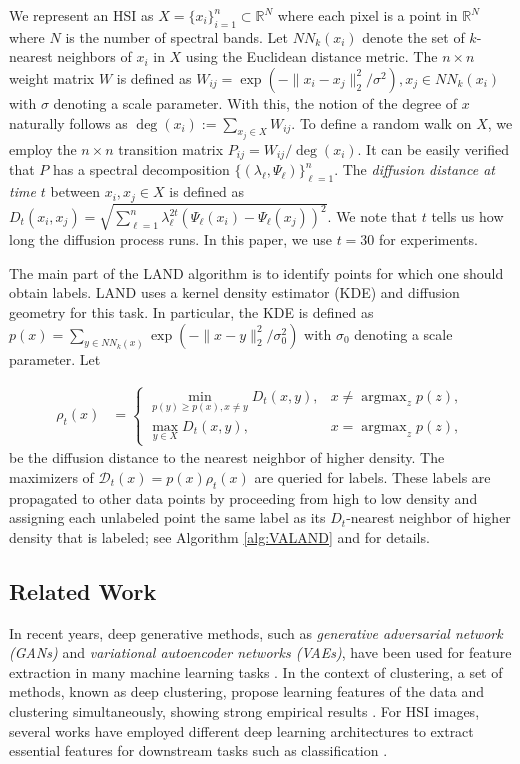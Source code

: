 \documentclass{article}
\DeclareMathOperator*{\argmax}{argmax} %
\def\R{\mathbb{R}}
\def\R{{\mathbb R}}
\newcommand{\Dt}{\mathcal{D}_{t}}
\begin{document}
We represent an HSI as $X=\{x_{i}\}_{i=1}^{n}\subset\mathbb{R}^{N}$ where each pixel is a point in $\R^{N}$ where $N$ is the number of spectral bands. Let $NN_{k}(x_{i})$ denote the set of $k$-nearest neighbors of $x_{i}$ in $X$ using the Euclidean distance metric.
The $n\times n$ weight matrix $W$ is defined as $W_{ij}=\exp(-\|x_{i}-x_{j}\|_{2}^{2}/\sigma^{2}), x_{j}\in NN_{k}(x_{i})$ with $\sigma$ denoting a scale parameter. With this, the notion of the degree of $x$ naturally follows as $\deg(x_{i}):=\sum_{x_{j}\in X}W_{ij}$. To define a random walk on $X$, we employ the $n\times n$ transition matrix $P_{ij}={W_{ij}}\big/{\deg(x_{i})}.$ It can be easily verified that $P$ has a spectral decomposition $\{(\lambda_{\ell},\Psi_{\ell})\}_{\ell=1}^{n}$. The \emph{diffusion distance at time $t$} between $x_{i},x_{j}\in X$ is defined as $D_{t}(x_{i},x_{j})=\sqrt{\sum\nolimits_{\ell=1}^{n}\lambda_{\ell}^{2t}(\Psi_{\ell}(x_{i})-\Psi_{\ell}(x_{j}))^{2}}$.  We note that $t$ tells us how long the diffusion process runs. In this paper, we use $t=30$ for experiments.

The main part of the LAND algorithm is to identify points for which one should obtain labels. LAND uses a kernel density estimator (KDE) and diffusion geometry for this task. In particular, the KDE is defined as $p(x)=\sum_{y\in NN_{k}(x)}\exp(-\|x-y\|_{2}^{2}/\sigma_{0}^{2})$ with $\sigma_0$ denoting a scale parameter.  Let 

\begin{align}\label{eqn:rho}
\rho_{t}(x) &=
\begin{cases}
\displaystyle\min_{p(y)\ge p(x), x\neq y} D_{t}(x,y), &x\neq \displaystyle\argmax_{z}p(z), \\
\displaystyle\max_{y\in X} D_{t}(x,y), & x=\displaystyle\argmax_{z}p(z),
\end{cases}
\end{align} 
be the diffusion distance to the nearest neighbor of higher density.  The maximizers of $\Dt(x)=p(x)\rho_{t}(x)$ are queried for labels.  These labels are propagated to other data points by proceeding from high to low density and assigning each unlabeled point the same label as its $D_{t}$-nearest neighbor of higher density that is labeled; see Algorithm \ref{alg:VALAND} and \cite{Maggioni2019_LAND} for details. 

\subsection{Related Work}
In recent years, deep generative methods, such as \emph{generative adversarial network (GANs)} and \emph{variational autoencoder networks (VAEs)}, have been used for feature extraction in many machine learning tasks \cite{ehsan2017infinite,makhzani2015adversarial}. In the context of clustering, a set of methods, known as deep clustering, propose learning features of the data and clustering simultaneously, showing strong empirical results \cite{tian2014learning,song2013auto,xie2016unsupervised}. For HSI images, several works have employed different deep learning architectures to extract essential features for downstream tasks such as classification \cite{chen2014deep,chen2016deep,li2017spectral,he2017multi,paoletti2019deep}. 
\end{document}
